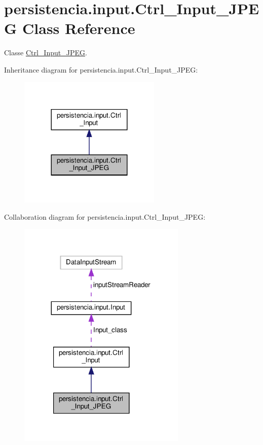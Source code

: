 \hypertarget{classpersistencia_1_1input_1_1Ctrl__Input__JPEG}{}\section{persistencia.\+input.\+Ctrl\+\_\+\+Input\+\_\+\+J\+P\+EG Class Reference}
\label{classpersistencia_1_1input_1_1Ctrl__Input__JPEG}


Classe \hyperlink{classpersistencia_1_1input_1_1Ctrl__Input__JPEG}{Ctrl\+\_\+\+Input\+\_\+\+J\+P\+EG}.  




Inheritance diagram for persistencia.\+input.\+Ctrl\+\_\+\+Input\+\_\+\+J\+P\+EG\+:\nopagebreak
\begin{figure}[H]
\begin{center}
\leavevmode
\includegraphics[width=192pt]{classpersistencia_1_1input_1_1Ctrl__Input__JPEG__inherit__graph}
\end{center}
\end{figure}


Collaboration diagram for persistencia.\+input.\+Ctrl\+\_\+\+Input\+\_\+\+J\+P\+EG\+:\nopagebreak
\begin{figure}[H]
\begin{center}
\leavevmode
\includegraphics[width=227pt]{classpersistencia_1_1input_1_1Ctrl__Input__JPEG__coll__graph}
\end{center}
\end{figure}
